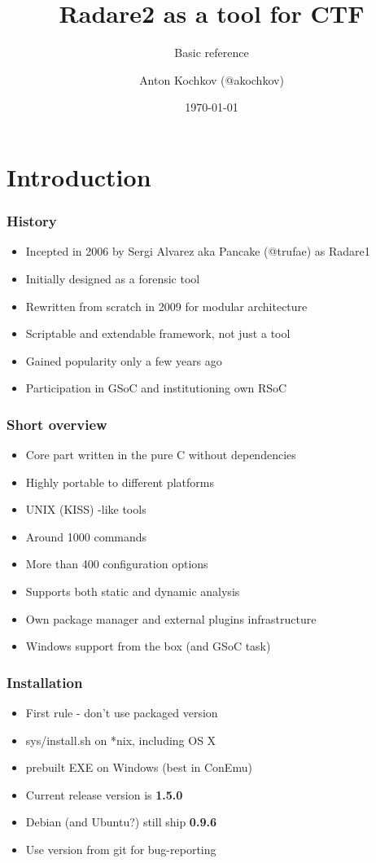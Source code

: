 \documentclass[10pt,pdf,utf8,english,compress,hyperref={unicode}]{beamer}
\title{Radare2 as a tool for CTF}
\subtitle{Basic reference}
\author{Anton Kochkov (@akochkov)}
\date{\today}
\institute{KeenLab of Tencent, TCTF 2017}
\begin{document}
\maketitle

\section{Introduction}

\begin{frame}[fragile]
  \frametitle{History}
  \begin{itemize}
	  \item Incepted in 2006 by Sergi Alvarez aka Pancake (@trufae) as Radare1
	  \item Initially designed as a forensic tool
	  \item Rewritten from scratch in 2009 for modular architecture
	  \item Scriptable and extendable framework, not just a tool
	  \item Gained popularity only a few years ago
	  \item Participation in GSoC and institutioning own
	  RSoC
  \end{itemize}
\end{frame}

\begin{frame}[fragile]
  \frametitle{Short overview}
  \begin{itemize}
	\item Core part written in the pure C without dependencies
	\item Highly portable to different platforms
	\item UNIX (KISS) -like tools
	\item Around 1000 commands
	\item More than 400 configuration options
	\item Supports both static and dynamic analysis
	\item Own package manager and external plugins infrastructure
	\item Windows support from the box (and GSoC task)
  \end{itemize}
\end{frame}

\begin{frame}[fragile]
  \frametitle{Installation}
  \begin{itemize}
	  \item First rule - don't use packaged version
	  \item \alert{sys/install.sh} on *nix, including OS X
	  \item prebuilt EXE on Windows (best in ConEmu)
	  \item Current release version is \textbf{1.5.0}
	  \item Debian (and Ubuntu?) still ship \textbf{0.9.6}
	  \item Use version from git for bug-reporting
  \end{itemize}
\end{frame}
\end{document}
